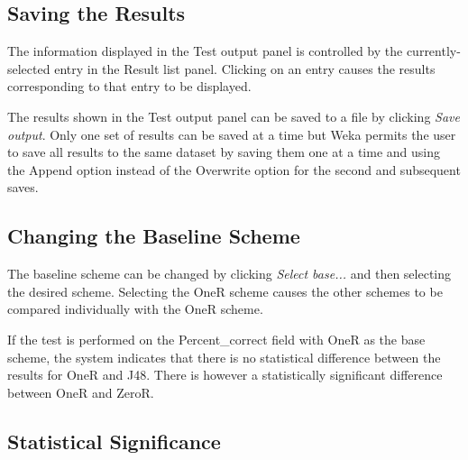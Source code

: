 \documentclass[a4paper]{article}
\begin{document}
\begin{center}
\end{center}


\subsection{Saving the Results}

The information displayed in the Test output panel is controlled by the currently-selected entry in the Result list panel. Clicking on an entry causes the results corresponding to that entry to be displayed.
\begin{center}
\end{center}

The results shown in the Test output panel can be saved to a file by clicking \textit{Save output}. Only one set of results can be saved at a time but Weka permits the user to save all results to the same dataset by saving them one at a time and using the Append option instead of the Overwrite option for the second and subsequent saves.
\begin{center}
\end{center}


\subsection{Changing the Baseline Scheme}

The baseline scheme can be changed by clicking \textit{Select base...} and then selecting the desired scheme. Selecting the OneR scheme causes the other schemes to be compared individually with the OneR scheme.
\begin{center}
\end{center}

If the test is performed on the Percent\_correct field with OneR as the base scheme, the system indicates that there is no statistical difference between the results for OneR and J48. There is however a statistically significant difference between OneR and ZeroR.
\begin{center}
\end{center}


\subsection{Statistical Significance}
\end{document}
